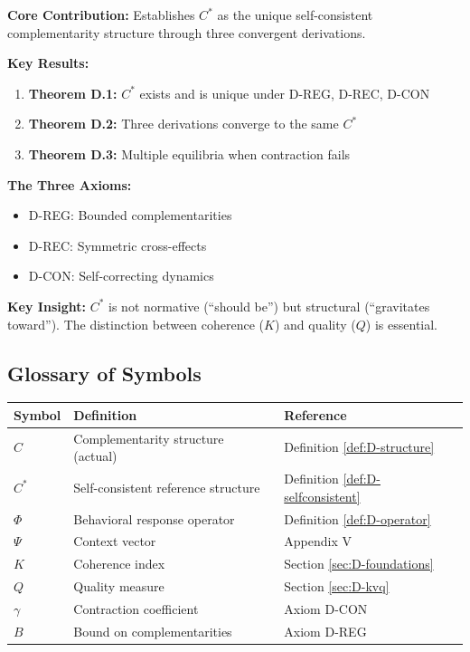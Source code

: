 \begin{tcolorbox}[colback=blue!5!white, colframe=blue!75!black,
    title=\textbf{Appendix D Summary: FORMAL-CSTAR}]

\textbf{Core Contribution:}
Establishes $C^*$ as the unique self-consistent complementarity structure
through three convergent derivations.

\textbf{Key Results:}
\begin{enumerate}[nosep]
    \item \textbf{Theorem D.1:} $C^*$ exists and is unique under D-REG, D-REC, D-CON
    \item \textbf{Theorem D.2:} Three derivations converge to the same $C^*$
    \item \textbf{Theorem D.3:} Multiple equilibria when contraction fails
\end{enumerate}

\textbf{The Three Axioms:}
\begin{itemize}[nosep]
    \item D-REG: Bounded complementarities
    \item D-REC: Symmetric cross-effects
    \item D-CON: Self-correcting dynamics
\end{itemize}

\textbf{Key Insight:}
$C^*$ is not normative (``should be'') but structural (``gravitates toward'').
The distinction between coherence ($K$) and quality ($Q$) is essential.

\end{tcolorbox}


\subsection{Glossary of Symbols}

\begin{center}
\renewcommand{\arraystretch}{1.3}
\begin{tabular}{@{}lll@{}}
\toprule
\textbf{Symbol} & \textbf{Definition} & \textbf{Reference} \\
\midrule
$C$ & Complementarity structure (actual) & Definition \ref{def:D-structure} \\
$C^*$ & Self-consistent reference structure & Definition \ref{def:D-selfconsistent} \\
$\Phi$ & Behavioral response operator & Definition \ref{def:D-operator} \\
$\Psi$ & Context vector & Appendix V \\
$K$ & Coherence index & Section \ref{sec:D-foundations} \\
$Q$ & Quality measure & Section \ref{sec:D-kvq} \\
$\gamma$ & Contraction coefficient & Axiom D-CON \\
$B$ & Bound on complementarities & Axiom D-REG \\
\bottomrule
\end{tabular}
\end{center}


